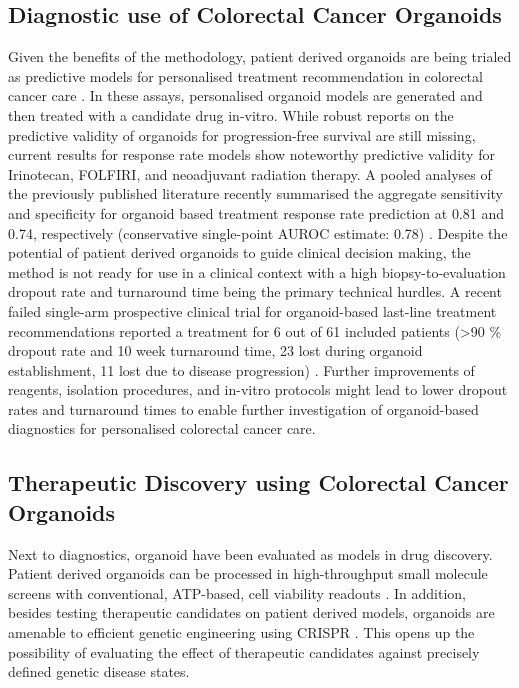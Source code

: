 \begin{flushleft}
\subsection{Diagnostic use of Colorectal Cancer Organoids}

Given the benefits of the methodology, patient derived organoids are being trialed as predictive models for personalised treatment recommendation in colorectal cancer care \citep{vandeweteringProspectiveDerivationLiving2015, vlachogiannisPatientderivedOrganoidsModel2018, ganeshRectalCancerOrganoid2019, ooftPatientderivedOrganoidsCan2019, yaoPatientDerivedOrganoidsPredict2020a}. In these assays, personalised organoid models are generated and then treated with a candidate drug in-vitro. While robust reports on the predictive validity of organoids for progression-free survival are still missing, current results for response rate models show noteworthy predictive validity for Irinotecan, FOLFIRI, and neoadjuvant radiation therapy. A pooled analyses of the previously published literature recently summarised the aggregate sensitivity and specificity for organoid based treatment response rate prediction at 0.81 and 0.74, respectively (conservative single-point AUROC estimate: 0.78) \citep{wensinkPatientderivedOrganoidsPredictive2021, zhangNoteROCAnalysis2005}. Despite the potential of patient derived organoids to guide clinical decision making, the method is not ready for use in a clinical context with a high biopsy-to-evaluation dropout rate and turnaround time being the primary technical hurdles. A recent failed single-arm prospective clinical trial for organoid-based last-line treatment recommendations reported a treatment for 6 out of 61 included patients (>90 \% dropout rate and 10 week turnaround time, 23 lost during organoid establishment, 11 lost due to disease progression) \citep{ooftProspectiveExperimentalTreatment2021}. Further improvements of reagents, isolation procedures, and in-vitro protocols might lead to lower dropout rates and turnaround times to enable further investigation of organoid-based diagnostics for personalised colorectal cancer care. \par

\subsection{Therapeutic Discovery using Colorectal Cancer Organoids} 

Next to diagnostics, organoid have been evaluated as models in drug discovery. Patient derived organoids can be processed in high-throughput small molecule screens with conventional, ATP-based, cell viability readouts \citep{vandeweteringProspectiveDerivationLiving2015}. In addition, besides testing therapeutic candidates on patient derived models, organoids are amenable to efficient genetic engineering using CRISPR \citep{matanoModelingColorectalCancer2015a, drostUseCRISPRmodifiedHuman2017}. This opens up the possibility of evaluating the effect of therapeutic candidates against precisely defined genetic disease states.


\end{flushleft}
